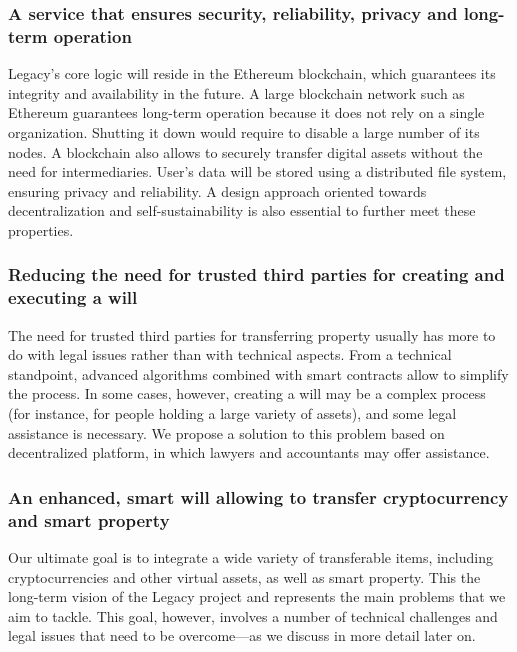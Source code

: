 \subsubsection*{A service that ensures security, reliability, privacy and long-term operation} %
\label{ssub:a_service_that_ensures_security_reliability_privacy_and_long_term_operation}
Legacy's core logic will reside in the Ethereum blockchain, which guarantees its integrity and availability in the future. 
A large blockchain network such as Ethereum guarantees long-term operation because it does not rely on a single organization. Shutting it down would require to disable a large number of its nodes.
A blockchain also allows to securely transfer digital assets without the need for intermediaries.
User's data will be stored using a distributed file system, ensuring privacy and reliability.
A design approach oriented towards decentralization and self-sustainability is also essential to further meet these properties.


\subsubsection*{Reducing the need for trusted third parties for creating and executing a will} %
\label{ssub:reducing_the_need_for_trusted_third_parties_for_creating_and_executing_a_will}
The need for trusted third parties for transferring property usually has more to do with legal issues rather than with technical aspects. From a technical standpoint, advanced algorithms combined with smart contracts allow to simplify the process. In some cases, however, creating a will may be a complex process (for instance, for people holding a large variety of assets), and some legal assistance is necessary. We propose a solution to this problem based on decentralized platform, in which lawyers and accountants may offer assistance.

\subsubsection*{An enhanced, smart will allowing to transfer cryptocurrency and smart property} %
\label{ssub:_an_enhanced_smart_will_allowing_to_transfer_cryptocurrency_and_smart_property_}
Our ultimate goal is to integrate a wide variety of transferable items, including cryptocurrencies and other virtual assets, as well as smart property. This the long-term vision of the Legacy project and represents the main problems that we aim to tackle. This goal, however, involves a number of technical challenges and legal issues that need to be overcome---as we discuss in more detail later on.

